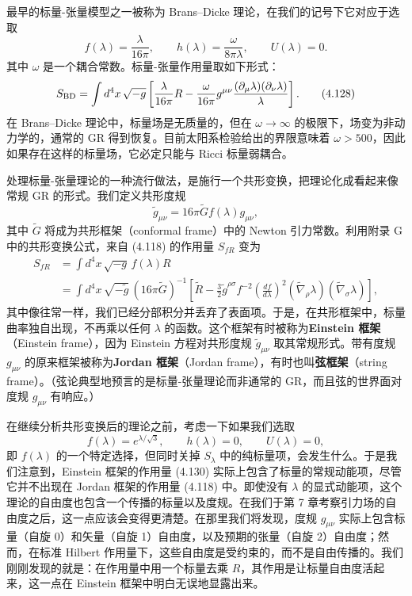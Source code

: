 最早的标量-张量模型之一被称为 Brans–Dicke 理论，在我们的记号下它对应于选取
\begin{equation*}
f(\lambda) = \frac{\lambda}{16\pi}, \qquad h(\lambda) = \frac{\omega}{8\pi\lambda}, \qquad U(\lambda) = 0.
\tag{4.127}
\end{equation*}
其中 $\omega$ 是一个耦合常数。标量-张量作用量取如下形式：
\begin{equation*}
S_{\rm BD} = \int d^4x\,\sqrt{-g}\left[\frac{\lambda}{16\pi}R - \frac{\omega}{16\pi}g^{\mu\nu}\frac{(\partial_\mu\lambda)(\partial_\nu\lambda)}{\lambda}\right].
\tag{4.128}
\end{equation*}
在 Brans–Dicke 理论中，标量场是无质量的，但在 $\omega \to \infty$ 的极限下，场变为非动力学的，通常的 GR 得到恢复。目前太阳系检验给出的界限意味着 $\omega > 500$，因此如果存在这样的标量场，它必定只能与 Ricci 标量弱耦合。

处理标量-张量理论的一种流行做法，是施行一个共形变换，把理论化成看起来像常规 GR 的形式。我们定义共形度规
\begin{equation*}
\widetilde{g}_{\mu\nu} = 16\pi\widetilde{G}f(\lambda)g_{\mu\nu},
\tag{4.129}
\end{equation*}
其中 $\widetilde{G}$ 将成为共形框架（conformal frame）中的 Newton 引力常数。利用附录 G 中的共形变换公式，来自 (4.118) 的作用量 $S_{fR}$ 变为
\begin{align*}
S_{fR} &= \int d^4x\,\sqrt{-g}\, f(\lambda)R \\
&= \int d^4x\,\sqrt{-\widetilde{g}}\,(16\pi\widetilde{G})^{-1}\left[\widetilde{R} - \frac{3}{2}\widetilde{g}^{\rho\sigma}f^{-2}\left(\frac{df}{d\lambda}\right)^2(\widetilde{\nabla}_\rho\lambda)(\widetilde{\nabla}_\sigma\lambda)\right],
\tag{4.130}
\end{align*}
其中像往常一样，我们已经分部积分并丢弃了表面项。于是，在共形框架中，标量曲率独自出现，不再乘以任何 $\lambda$ 的函数。这个框架有时被称为\textbf{Einstein 框架}（Einstein frame），因为 Einstein 方程对共形度规 $\widetilde{g}_{\mu\nu}$ 取其常规形式。带有度规 $g_{\mu\nu}$ 的原来框架被称为\textbf{Jordan 框架}（Jordan frame），有时也叫\textbf{弦框架}（string frame）。（弦论典型地预言的是标量-张量理论而非通常的 GR，而且弦的世界面对度规 $g_{\mu\nu}$ 有响应。）

在继续分析共形变换后的理论之前，考虑一下如果我们选取
\begin{equation*}
f(\lambda) = e^{\lambda/\sqrt{3}}, \qquad h(\lambda) = 0, \qquad U(\lambda) = 0,
\tag{4.131}
\end{equation*}
即 $f(\lambda)$ 的一个特定选择，但同时关掉 $S_\lambda$ 中的纯标量项，会发生什么。于是我们注意到，Einstein 框架的作用量 (4.130) 实际上包含了标量的常规动能项，尽管它并不出现在 Jordan 框架的作用量 (4.118) 中。即使没有 $\lambda$ 的显式动能项，这个理论的自由度也包含一个传播的标量以及度规。在我们于第 7 章考察引力场的自由度之后，这一点应该会变得更清楚。在那里我们将发现，度规 $g_{\mu\nu}$ 实际上包含标量（自旋 0）和矢量（自旋 1）自由度，以及预期的张量（自旋 2）自由度；然而，在标准 Hilbert 作用量下，这些自由度是受约束的，而不是自由传播的。我们刚刚发现的就是：在作用量中用一个标量去乘 $R$，其作用是让标量自由度活起来，这一点在 Einstein 框架中明白无误地显露出来。

